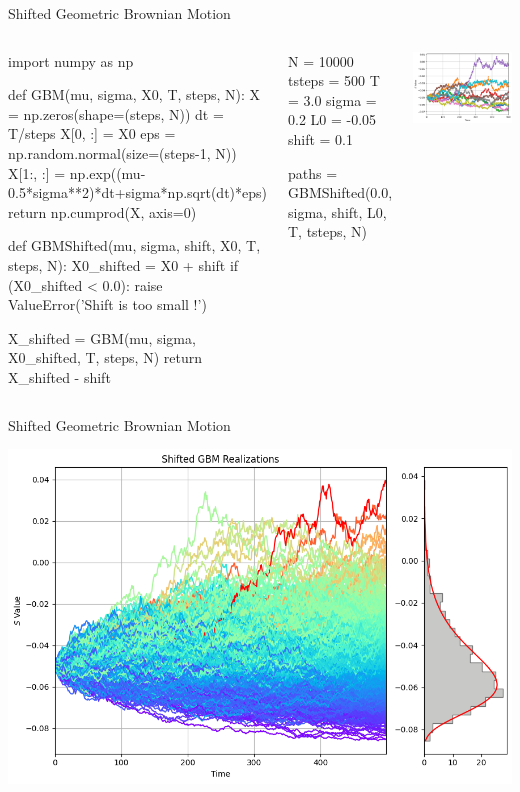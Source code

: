 \documentclass{beamer}
\begin{document}
\begin{frame}[fragile]{Shifted Geometric Brownian Motion}
\begin{columns}
\begin{ipython}
import numpy as np

def GBM(mu, sigma, X0, T, steps, N):
    X = np.zeros(shape=(steps, N))
    dt = T/steps
    X[0, :] = X0
    eps = np.random.normal(size=(steps-1, N))
    X[1:, :] = np.exp((mu-0.5*sigma**2)*dt+sigma*np.sqrt(dt)*eps)
    return np.cumprod(X, axis=0)

def GBMShifted(mu, sigma, shift, X0, T, steps, N):
    X0_shifted = X0 + shift
    if (X0_shifted < 0.0):
        raise ValueError('Shift is too small !')

    X_shifted = GBM(mu, sigma, X0_shifted, T, steps, N)
    return X_shifted - shift
\end{ipython}
\begin{ipython}
N = 10000
tsteps = 500
T = 3.0
sigma = 0.2
L0 = -0.05
shift = 0.1

paths = GBMShifted(0.0, sigma, shift, L0, T, tsteps, N)    
\end{ipython}
\begin{center}
	\includegraphics[width=0.9\linewidth]{images/shifted_gbm}
\end{center}
	\end{columns}
\end{frame}

\begin{frame}{Shifted Geometric Brownian Motion}
	\begin{center}
		\includegraphics[width=0.7\linewidth]{images/shifted_gbm_density}
	\end{center}
\end{frame}
\end{document}
